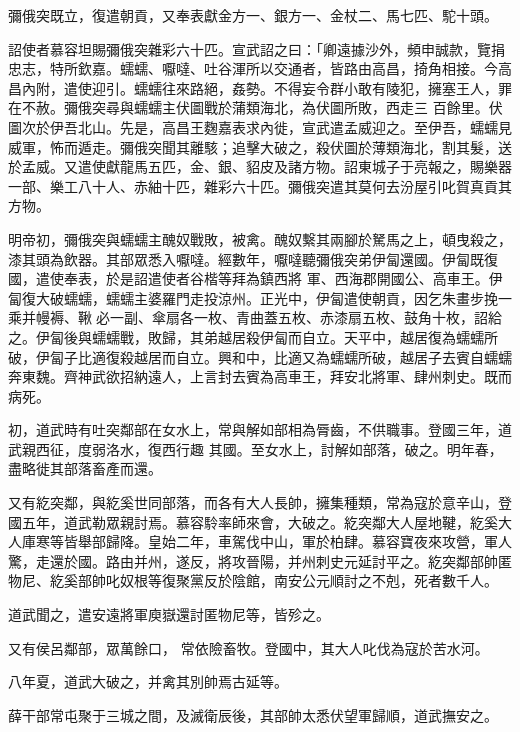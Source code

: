 \begin{pinyinscope}
 彌俄突既立，復遣朝貢，又奉表獻金方一、銀方一、金杖二、馬七匹、駝十頭。



 詔使者慕容坦賜彌俄突雜彩六十匹。宣武詔之曰：「卿遠據沙外，頻申誠款，覽捐忠志，特所欽嘉。蠕蠕、嚈噠、吐谷渾所以交通者，皆路由高昌，掎角相接。今高昌內附，遣使迎引。蠕蠕往來路絕，姦勢。不得妄令群小敢有陵犯，擁塞王人，罪在不赦。彌俄突尋與蠕蠕主伏圖戰於蒲類海北，為伏圖所敗，西走三
 百餘里。伏圖次於伊吾北山。先是，高昌王麴嘉表求內徙，宣武遣孟威迎之。至伊吾，蠕蠕見威軍，怖而遁走。彌俄突聞其離駭；追擊大破之，殺伏圖於薄類海北，割其髮，送於孟威。又遣使獻龍馬五匹，金、銀、貂皮及諸方物。詔東城子于亮報之，賜樂器一部、樂工八十人、赤紬十匹，雜彩六十匹。彌俄突遣其莫何去汾屋引叱賀真貢其方物。



 明帝初，彌俄突與蠕蠕主醜奴戰敗，被禽。醜奴繫其兩腳於駑馬之上，頓曳殺之，漆其頭為飲器。其部眾悉入嚈噠。經數年，嚈噠聽彌俄突弟伊匐還國。伊匐既復國，遣使奉表，於是詔遣使者谷楷等拜為鎮西將
 軍、西海郡開國公、高車王。伊匐復大破蠕蠕，蠕蠕主婆羅門走投涼州。正光中，伊匐遣使朝貢，因乞朱畫步挽一乘并幔褥、鞦必一副、傘扇各一枚、青曲蓋五枚、赤漆扇五枚、鼓角十枚，詔給之。伊匐後與蠕蠕戰，敗歸，其弟越居殺伊匐而自立。天平中，越居復為蠕蠕所破，伊匐子比適復殺越居而自立。興和中，比適又為蠕蠕所破，越居子去賓自蠕蠕奔東魏。齊神武欲招納遠人，上言封去賓為高車王，拜安北將軍、肆州刺史。既而病死。



 初，道武時有吐突鄰部在女水上，常與解如部相為脣齒，不供職事。登國三年，道武親西征，度弱洛水，復西行趣
 其國。至女水上，討解如部落，破之。明年春，盡略徙其部落畜產而還。



 又有紇突鄰，與紇奚世同部落，而各有大人長帥，擁集種類，常為寇於意辛山，登國五年，道武勒眾親討焉。慕容駖率師來會，大破之。紇突鄰大人屋地鞬，紇奚大人庫寒等皆舉部歸降。皇始二年，車駕伐中山，軍於柏肆。慕容寶夜來攻營，軍人驚，走還於國。路由并州，遂反，將攻晉陽，并州刺史元延討平之。紇突鄰部帥匿物尼、紇奚部帥叱奴根等復聚黨反於陰館，南安公元順討之不剋，死者數千人。



 道武聞之，遣安遠將軍庾嶽還討匿物尼等，皆殄之。



 又有侯呂鄰部，眾萬餘口，
 常依險畜牧。登國中，其大人叱伐為寇於苦水河。



 八年夏，道武大破之，并禽其別帥焉古延等。



 薛干部常屯聚于三城之間，及滅衛辰後，其部帥太悉伏望軍歸順，道武撫安之。




\end{pinyinscope}
